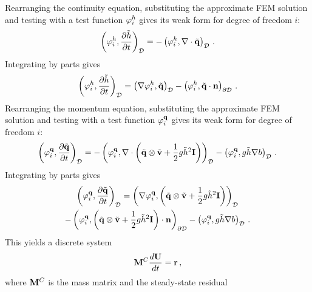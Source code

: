 Rearranging the continuity equation, substituting the approximate FEM
solution and testing with a test function $\varphi_i^h$ gives its
weak form for degree of freedom $i$:
\begin{equation}
  \left(\varphi_i^h,\frac{\partial \tilde{h}}{\partial t}\right)_{\mathcal{D}}
  = - \left(\varphi_i^h,\nabla\cdot\tilde{\mathbf{q}}
    \right)_{\mathcal{D}} \,.
\end{equation}
Integrating by parts gives
\begin{equation}
  \left(\varphi_i^h,\frac{\partial \tilde{h}}{\partial t}\right)_{\mathcal{D}}
  = \left(\nabla\varphi_i^h,\tilde{\mathbf{q}}\right)_{\mathcal{D}}
  - \left(\varphi_i^h,\tilde{\mathbf{q}}\cdot\mathbf{n}
    \right)_{\partial\mathcal{D}} \,.
\end{equation}
Rearranging the momentum equation, substituting the approximate FEM
solution and testing with a test function $\varphi_i^{\mathbf{q}}$
gives its weak form for degree of freedom $i$:
\begin{equation}
  \left(\varphi_i^{\mathbf{q}},\frac{\partial \tilde{\mathbf{q}}}{\partial t}
  \right)_{\mathcal{D}}
  = - \left(\varphi_i^{\mathbf{q}},\nabla\cdot
    \left(\tilde{\mathbf{q}}\otimes\tilde{\mathbf{v}}
  + \frac{1}{2}g\tilde{h}^2\mathbf{I}\right)\right)_{\mathcal{D}}
  - \left(\varphi_i^{\mathbf{q}},
    g\tilde{h}\nabla b\right)_{\mathcal{D}} \,.
\end{equation}
Integrating by parts gives
\begin{multline}
  \left(\varphi_i^{\mathbf{q}},\frac{\partial \tilde{\mathbf{q}}}{\partial t}
  \right)_{\mathcal{D}}
  = \left(\nabla\varphi_i^{\mathbf{q}},
    \left(\tilde{\mathbf{q}}\otimes\tilde{\mathbf{v}}
    + \frac{1}{2}g\tilde{h}^2\mathbf{I}\right)\right)_{\mathcal{D}}
  \\- \left(\varphi_i^{\mathbf{q}},
    \left(\tilde{\mathbf{q}}\otimes\tilde{\mathbf{v}}
    + \frac{1}{2}g \tilde{h}^2\mathbf{I}\right)\cdot\mathbf{n}
    \right)_{\partial\mathcal{D}}
  - \left(\varphi_i^{\mathbf{q}},
    g\tilde{h}\nabla b\right)_{\mathcal{D}} \,.
\end{multline}
This yields a discrete system
\begin{equation}
  \mathbf{M}^C\frac{d\mathbf{U}}{dt} = \mathbf{r} \,,
\end{equation}
where $\mathbf{M}^C$ is the mass matrix and the steady-state residual
